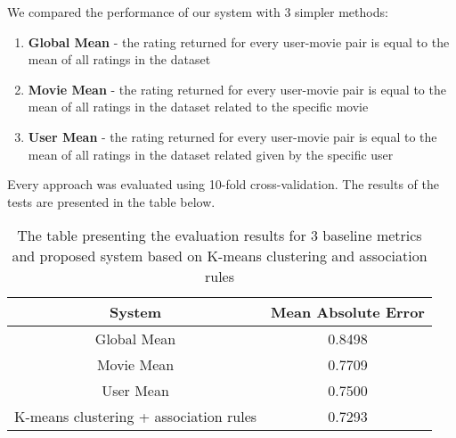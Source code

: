 We compared the performance of our system with 3 simpler methods:

\begin{enumerate}
    \item \textbf{Global Mean} - the rating returned for every user-movie pair is equal to the mean of all ratings in the dataset
    \item \textbf{Movie Mean} -  the rating returned for every user-movie pair is equal to the mean of all ratings in the dataset related to the specific movie
    \item \textbf{User Mean} - the rating returned for every user-movie pair is equal to the mean of all ratings in the dataset related given by the specific user
\end{enumerate}

Every approach was evaluated using 10-fold cross-validation. The results of the tests are presented in the table below.

\begin{table}[h]
\centering
\begin{tabular}{|c|c|}
\hline
System                                & Mean Absolute Error \\ \hline
Global Mean                           & 0.8498              \\ \hline
Movie Mean                            & 0.7709              \\ \hline
User Mean                             & 0.7500              \\ \hline
K-means clustering + association rules & 0.7293              \\ \hline
\end{tabular}
\caption{The table presenting the evaluation results for 3 baseline metrics and proposed system based on K-means clustering and association rules}
\label{tab:my-table}
\end{table}